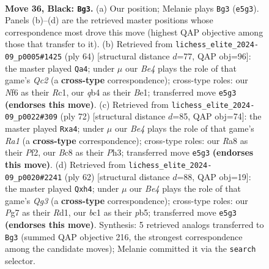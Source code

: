 \documentclass[11pt]{article}
\begin{document}
\clearpage

\begin{figure}[p]\centering
\begin{subfigure}{0.46\textwidth}\centering
\resizebox{\linewidth}{!}{%
\newchessgame
\chessboard[
  setfen={r1b4k/ppp2pp1/5n1p/3qb3/1Q6/5P1P/PPB3P1/R1B3K1 b - - 13 36},
  showmover=false,
  pgfstyle=straightmove, color=movearrow, markmove={e5-g3}
]}
\caption{}
\end{subfigure}\hfill
\begin{subfigure}{0.46\textwidth}\centering
\resizebox{\linewidth}{!}{%
\newchessgame
\chessboard[
  setfen={2r3k1/1b2bp2/1qp1p1pp/8/1p1P4/4PB1P/1PQ2PP1/2R1B1K1 w - - 0 33},
  showmover=false,
  pgfstyle=straightmove, color=movearrow, markmove={c2-a4}
]}
\caption{}
\end{subfigure}
\\[4pt]
\begin{subfigure}{0.46\textwidth}\centering
\resizebox{\linewidth}{!}{%
\newchessgame
\chessboard[
  setfen={1q6/1r3pk1/2p1p1p1/2P1P1b1/p2BQ2p/2P4P/5PP1/R5K1 w - - 0 37},
  showmover=false,
  pgfstyle=straightmove, color=movearrow, markmove={a1-a4}
]}
\caption{}
\end{subfigure}\hfill
\begin{subfigure}{0.46\textwidth}\centering
\resizebox{\linewidth}{!}{%
\newchessgame
\chessboard[
  setfen={4k1r1/3n1p2/2bBp3/1p2P1pp/1P5q/4P1Q1/4B1P1/3R2K1 w - - 0 32},
  showmover=false,
  pgfstyle=straightmove, color=movearrow, markmove={g3-h4}
]}
\caption{}
\end{subfigure}
\caption{\textbf{Move 36, Black: \texttt{Bg3}.} (a) Our position; Melanie plays \texttt{Bg3} (\texttt{e5g3}). Panels (b)--(d) are the retrieved master positions whose correspondence most drove this move (highest QAP objective among those that transfer to it). (b) Retrieved from \texttt{lichess\_elite\_2024-09\_p0005\#1425} (ply 64) [structural distance $d$=77, QAP obj=96]: the master played \texttt{Qa4}; under $\mu$ our \emph{Be4} plays the role of that game's \emph{Qc2} (a \textbf{cross-type} correspondence); cross-type roles: our \emph{N}f6 as their \emph{R}c1, our \emph{q}b4 as their \emph{B}e1; transferred move \texttt{e5g3} \textbf{(endorses this move)}. (c) Retrieved from \texttt{lichess\_elite\_2024-09\_p0022\#309} (ply 72) [structural distance $d$=85, QAP obj=74]: the master played \texttt{Rxa4}; under $\mu$ our \emph{Be4} plays the role of that game's \emph{Ra1} (a \textbf{cross-type} correspondence); cross-type roles: our \emph{R}a8 as their \emph{P}f2, our \emph{B}c8 as their \emph{P}h3; transferred move \texttt{e5g3} \textbf{(endorses this move)}. (d) Retrieved from \texttt{lichess\_elite\_2024-09\_p0020\#2241} (ply 62) [structural distance $d$=88, QAP obj=19]: the master played \texttt{Qxh4}; under $\mu$ our \emph{Be4} plays the role of that game's \emph{Qg3} (a \textbf{cross-type} correspondence); cross-type roles: our \emph{P}g7 as their \emph{R}d1, our \emph{b}c1 as their \emph{p}b5; transferred move \texttt{e5g3} \textbf{(endorses this move)}. Synthesis: 5 retrieved analogs transferred to \texttt{Bg3} (summed QAP objective 216, the strongest correspondence among the candidate moves); Melanie committed it via the \texttt{search} selector.}

\end{figure}
\end{document}

